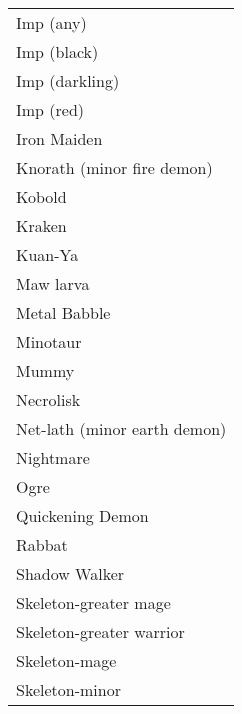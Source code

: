 \documentclass[twoside]{book}
\begin{document}
\begin{longtable}{p{1.25in}}
  \raggedright
           Imp (any) 
  \tabularnewline
      
  \raggedright
           Imp (black) 
  \tabularnewline
      
  \raggedright
           Imp (darkling) 
  \tabularnewline
      
  \raggedright
           Imp (red) 
  \tabularnewline
      
  \raggedright
           Iron Maiden 
  \tabularnewline
      
  \raggedright
           Knorath (minor fire demon)
           
  \tabularnewline
      
  \raggedright
           Kobold 
  \tabularnewline
      
  \raggedright
           Kraken 
  \tabularnewline
      
  \raggedright
           Kuan-Ya 
  \tabularnewline
      
  \raggedright
           Maw larva 
  \tabularnewline
      
  \raggedright
           Metal Babble 
  \tabularnewline
      
  \raggedright
           Minotaur 
  \tabularnewline
      
  \raggedright
           Mummy 
  \tabularnewline
      
  \raggedright
           Necrolisk 
  \tabularnewline
      
  \raggedright
           Net-lath (minor earth demon)
           
  \tabularnewline
      
  \raggedright
           Nightmare 
  \tabularnewline
      
  \raggedright
           Ogre 
  \tabularnewline
      
  \raggedright
           Quickening Demon 
  \tabularnewline
      
  \raggedright
           Rabbat 
  \tabularnewline
      
  \raggedright
           Shadow Walker 
  \tabularnewline
      
  \raggedright
           Skeleton-greater mage 
  \tabularnewline
      
  \raggedright
           Skeleton-greater warrior
           
  \tabularnewline
      
  \raggedright
           Skeleton-mage 
  \tabularnewline
      
  \raggedright
           Skeleton-minor 
  \tabularnewline
      

\end{longtable}
\end{document}
